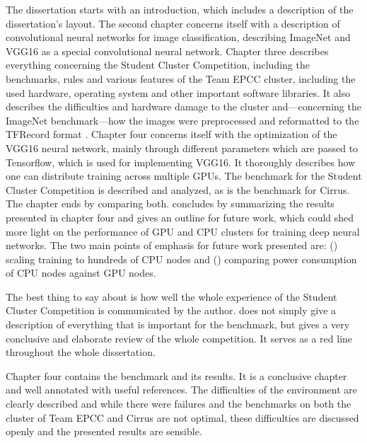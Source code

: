 \documentclass{article}
\begin{document}
The dissertation starts with an introduction, which
includes a description of the dissertation's layout.
The second chapter concerns itself with a description of
convolutional neural networks for image classification,
describing ImageNet and VGG16 as a special convolutional
neural network.
Chapter three describes everything concerning the Student
Cluster Competition, including the benchmarks, rules and
various features of the Team EPCC cluster, including the
used hardware, operating system and other important
software libraries.
It also describes the difficulties and hardware damage to
the cluster and---concerning the ImageNet benchmark---how
the images were preprocessed and reformatted to the
TFRecord format \citep{tf2015}.
Chapter four concerns itself with the optimization of the
VGG16 neural network, mainly through different parameters
which are passed to Tensorflow, which is used for
implementing VGG16.
It thoroughly describes how one can distribute training
across multiple GPUs.
The benchmark for the Student Cluster Competition is
described and analyzed, as is the benchmark for Cirrus.
The chapter ends by comparing both.
\citet{nita_2018} concludes by summarizing the results
presented in chapter four and gives an outline for future
work, which could shed more light on the performance of
GPU and CPU clusters for training deep neural networks.
The two main points of emphasis for future work presented
are: () scaling training to hundreds of
CPU nodes \citep[see e.g.][for distributing training onto
multiple CPUs]{you2017} and ()
comparing power consumption of CPU nodes against GPU nodes.

The best thing to say about \citet{nita_2018} is how well
the whole experience of the Student Cluster Competition is
communicated by the author.
\citet{nita_2018} does not simply give a description of
everything that is important for the benchmark, but gives
a very conclusive and elaborate review of the whole
competition.
It serves as a red line throughout the whole dissertation.

Chapter four contains the benchmark and its results.
It is a conclusive chapter and well annotated with useful
references.
The difficulties of the environment are clearly described
and while there were failures and the benchmarks on both
the cluster of Team EPCC and Cirrus are not optimal, these
difficulties are discussed openly and the presented results
are sensible.
\end{document}
